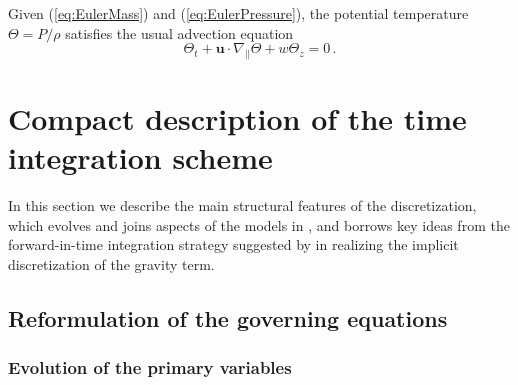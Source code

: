 \documentclass{ametsoc}
\theoremstyle{definition}
\newcommand{\eq}[1]{(\ref{#1})}
\newcommand{\vect}[1]{{\mathbf{#1}}}
\newcommand{\vu}{\vect{u}}
\begin{document}
Given \eq{eq:EulerMass} and \eq{eq:EulerPressure}, the potential temperature
$\Theta = P/\rho$ satisfies the usual advection equation
%
\begin{equation}
\Theta_t + \vu\cdot\nabla_\parallel \Theta + w \Theta_z = 0\,.
\end{equation}


\section{Compact description of the time integration scheme}
\label{sec:TimeDiscretizationSummary}

In this section we describe the main structural features of the discretization, which evolves and joins aspects of the models in \citet{KleinTCFD2009,BenacchioEtAl2014}, and borrows key ideas from the forward-in-time integration strategy suggested by \citet{SmolarkiewiczMargolin1993, SmolarkiewiczMargolin1997} in realizing the implicit discretization of the gravity term. 


\subsection{Reformulation of the governing equations}
\label{ssec:Reformulation}


\subsubsection{Evolution of the primary variables}
\label{sssec:PrimaryVariables}
\end{document}
